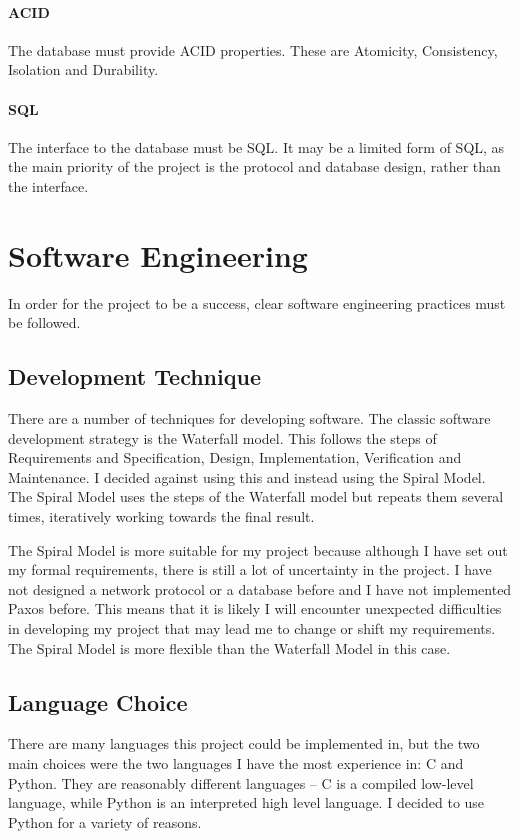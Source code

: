 \documentclass[12pt,twoside,notitlepage]{report}
\begin{document}
\paragraph{ACID} The database must provide ACID properties. These are Atomicity, Consistency,
Isolation and Durability.
\paragraph{SQL} The interface to the database must be SQL. It may be a limited form of SQL, as the
main priority of the project is the protocol and database design, rather than the interface.

\section{Software Engineering}

In order for the project to be a success, clear software engineering practices must be followed.

\subsection{Development Technique}

There are a number of techniques for developing software. The classic software development
strategy is the Waterfall model. This follows the steps of Requirements and Specification, Design,
Implementation, Verification and Maintenance. I decided against using this and instead using the
Spiral Model. The Spiral Model uses the steps of the Waterfall model but repeats them several
times, iteratively working towards the final result.

The Spiral Model is more suitable for my project because although I have set out my formal
requirements, there is still a lot of uncertainty in the project. I have not designed a network
protocol or a database before and I have not implemented Paxos before. This means that it is
likely I will encounter unexpected difficulties in developing my project that may lead me to
change or shift my requirements. The Spiral Model is more flexible than the Waterfall Model in
this case.

\subsection{Language Choice}

There are many languages this project could be implemented in, but the two main choices were the
two languages I have the most experience in: C and Python. They are reasonably different languages
-- C is a compiled low-level language, while Python is an interpreted high level language. I
decided to use Python for a variety of reasons.
\end{document}
